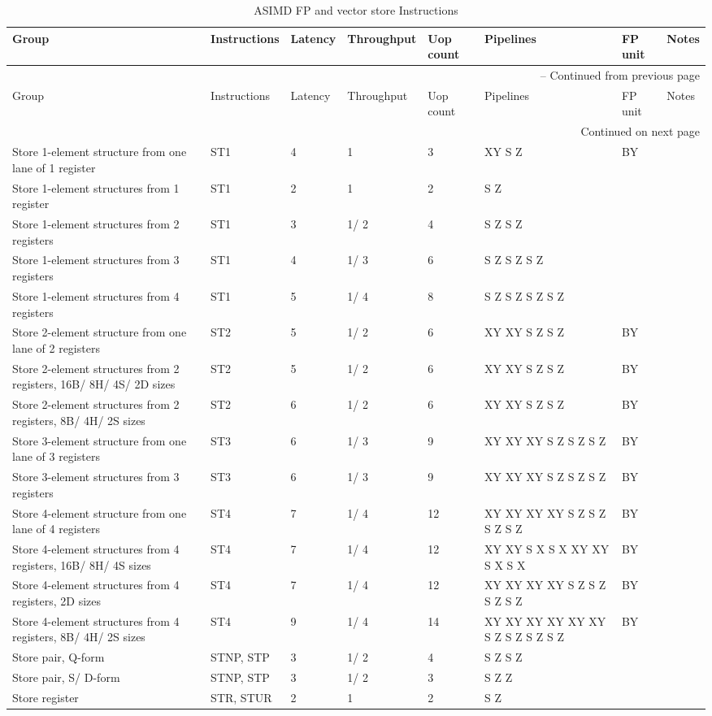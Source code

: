 \begin{longtable}{|p{1in}|p{1in}|l|l|l|p{1in}|l|p{1in}|}
\caption{ASIMD FP and vector store Instructions} \\
\hline
Group & Instructions & Latency & Throughput & Uop count & Pipelines & FP unit & Notes\\
\hline
\endfirsthead
\hline
\multicolumn{8}{|r|}{{\tablename\ \thetable{} -- Continued from previous page}} \\
\hline
Group & Instructions & Latency & Throughput & Uop count & Pipelines & FP unit & Notes\\
\hline
\endhead
\hline
\multicolumn{8}{|r|}{{Continued on next page}} \\
\hline
\endfoot
\hline
\endlastfoot
Store 1-element structure from one lane of 1 register & ST1 & 4 & 1 & 3 & XY S Z & BY & \\
\hline
Store 1-element structures from 1 register & ST1 & 2 & 1 & 2 & S Z &  & \\
\hline
Store 1-element structures from 2 registers & ST1 & 3 & 1/ 2 & 4 & S Z S Z &  & \\
\hline
Store 1-element structures from 3 registers & ST1 & 4 & 1/ 3 & 6 & S Z S Z S Z &  & \\
\hline
Store 1-element structures from 4 registers & ST1 & 5 & 1/ 4 & 8 & S Z S Z S Z S Z &  & \\
\hline
Store 2-element structure from one lane of 2 registers & ST2 & 5 & 1/ 2 & 6 & XY XY S Z S Z & BY & \\
\hline
Store 2-element structures from 2 registers, 16B/ 8H/ 4S/ 2D sizes & ST2 & 5 & 1/ 2 & 6 & XY XY S Z S Z & BY & \\
\hline
Store 2-element structures from 2 registers, 8B/ 4H/ 2S sizes & ST2 & 6 & 1/ 2 & 6 & XY XY S Z S Z & BY & \\
\hline
Store 3-element structure from one lane of 3 registers & ST3 & 6 & 1/ 3 & 9 & XY XY XY S Z S Z S Z & BY & \\
\hline
Store 3-element structures from 3 registers & ST3 & 6 & 1/ 3 & 9 & XY XY XY S Z S Z S Z & BY & \\
\hline
Store 4-element structure from one lane of 4 registers & ST4 & 7 & 1/ 4 & 12 & XY XY XY XY S Z S Z S Z S Z & BY & \\
\hline
Store 4-element structures from 4 registers, 16B/ 8H/ 4S sizes & ST4 & 7 & 1/ 4 & 12 & XY XY S X S X XY XY S X S X & BY & \\
\hline
Store 4-element structures from 4 registers, 2D sizes & ST4 & 7 & 1/ 4 & 12 & XY XY XY XY S Z S Z S Z S Z & BY & \\
\hline
Store 4-element structures from 4 registers, 8B/ 4H/ 2S sizes & ST4 & 9 & 1/ 4 & 14 & XY XY XY XY XY XY S Z S Z S Z S Z & BY & \\
\hline
Store pair, Q-form & STNP, STP & 3 & 1/ 2 & 4 & S Z S Z &  & \\
\hline
Store pair, S/ D-form & STNP, STP & 3 & 1/ 2 & 3 & S Z Z &  & \\
\hline
Store register & STR, STUR & 2 & 1 & 2 & S Z &  & \\
\hline
\end{longtable}
